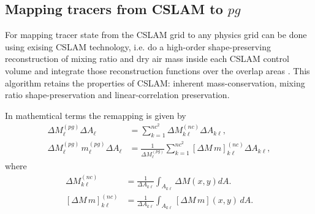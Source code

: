 \subsection{Mapping tracers from CSLAM to $pg$}
For mapping tracer state from the CSLAM grid to any physics grid can be done using exising CSLAM technology, i.e. do a high-order shape-preserving reconstruction of mixing ratio and dry air mass inside each CSLAM control volume and integrate those reconstruction functions over the overlap areas \citep{LNU2010JCP,NL2010JCP}. This algorithm retains the properties of CSLAM: inherent mass-conservation, mixing ratio shape-preservation and linear-correlation preservation. 

In mathemtical terms the remapping is given by
\begin{eqnarray}
\Delta M^{(pg)}_{\ell}\Delta A_{\ell} &=\sum_{k=1}^{nc^2}\Delta M^{(nc)}_{k\ell} \Delta A_{k\ell},\\
\Delta M^{(pg)}_{\ell}\, m^{(pg)}_{\ell}\Delta A_{\ell}&=\frac{1}{\Delta M^{(pg)}_{\ell}}\sum_{k=1}^{nc^2}\left[ \Delta M \, m\right]^{(nc)}_{k\ell} \Delta A_{k\ell},
\end{eqnarray}
where 
\begin{eqnarray}
\Delta M^{(nc)}_{k\ell} &= \frac{1}{\Delta A_{k\ell}}\int_{A_{k\ell}}\Delta M(x,y)dA.\\
{\left[ \Delta M\, m\right]}^{(nc)}_{k\ell} &=\frac{1}{\Delta A_{k\ell}}\int_{A_{k\ell}}\left[ \Delta M\, m\right] (x,y)\, dA.
\end{eqnarray}


